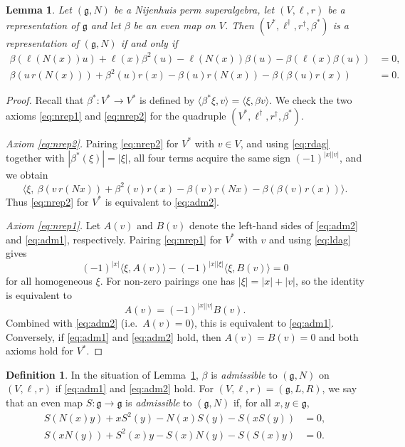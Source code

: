 \documentclass[11pt]{article}
\newtheorem{lemma}[theorem]{Lemma}
\theoremstyle{definition}
\newtheorem{definition}[theorem]{Definition}
\newcommand{\g}{\mathfrak{g}}
\newcommand{\lr}[1]{\langle #1\rangle}
\begin{document}
\begin{lemma}\label{lem:dualadm}
Let $(\g,N)$ be a Nijenhuis perm superalgebra, let $(V,\ell,r)$ be a representation of $\g$ and let $\beta$ be an even map on $V$. Then $(V^*,\ell^\dagger,r^\dagger,\beta^*)$ is a representation of $(\g,N)$ if and only if
\begin{align}
\beta(\ell(N(x))u)+\ell(x)\beta^2(u)-\ell(N(x))\beta(u)-\beta(\ell(x)\beta(u))&=0,\label{eq:adm1}\\
\beta(u\,r(N(x)))+\beta^2(u)r(x)-\beta(u)r(N(x))-\beta(\beta(u)r(x))&=0.\label{eq:adm2}
\end{align}
\end{lemma}
\begin{proof}
Recall that $\beta^*:V^*\to V^*$ is defined by $\lr{\beta^*\xi,v}=\lr{\xi,\beta v}$. We check the two axioms \eqref{eq:nrep1} and \eqref{eq:nrep2} for the quadruple $(V^*,\ell^\dagger,r^\dagger,\beta^*)$.

\emph{Axiom \eqref{eq:nrep2}.}
Pairing \eqref{eq:nrep2} for $V^*$ with $v\in V$, and using \eqref{eq:rdag} together with $|\beta^*(\xi)|=|\xi|$, all four terms acquire the same sign $(-1)^{|x||v|}$, and we obtain
\[
\lr{\xi,\ \beta(v\,r(Nx))+\beta^2(v)r(x)-\beta(v)r(Nx)-\beta(\beta(v)r(x))}.
\]
Thus \eqref{eq:nrep2} for $V^*$ is equivalent to \eqref{eq:adm2}.

\emph{Axiom \eqref{eq:nrep1}.}
Let $A(v)$ and $B(v)$ denote the left-hand sides of \eqref{eq:adm2} and \eqref{eq:adm1}, respectively. Pairing \eqref{eq:nrep1} for $V^*$ with $v$ and using \eqref{eq:ldag} gives
\[
(-1)^{|x|}\lr{\xi,A(v)}-(-1)^{|x||\xi|}\lr{\xi,B(v)}=0
\]
for all homogeneous $\xi$. For non-zero pairings one has $|\xi|=|x|+|v|$, so the identity is equivalent to
\[
A(v)=(-1)^{|x||v|}B(v).
\]
Combined with \eqref{eq:adm2} (i.e.\ $A(v)=0$), this is equivalent to \eqref{eq:adm1}. Conversely, if \eqref{eq:adm1} and \eqref{eq:adm2} hold, then $A(v)=B(v)=0$ and both axioms hold for $V^*$.
\end{proof}

\begin{definition}\label{def:admissible}
In the situation of Lemma~\ref{lem:dualadm}, $\beta$ is \emph{admissible} to $(\g,N)$ on $(V,\ell,r)$ if \eqref{eq:adm1} and \eqref{eq:adm2} hold. For $(V,\ell,r)=(\g,L,R)$, we say that an even map $S:\g\to\g$ is \emph{admissible} to $(\g,N)$ if, for all $x,y\in\g$,
\begin{align}
S(N(x)y)+xS^2(y)-N(x)S(y)-S(xS(y))&=0,\label{eq:S18}\\
S(xN(y))+S^2(x)y-S(x)N(y)-S(S(x)y)&=0.\label{eq:S19}
\end{align}
\end{definition}
\end{document}

